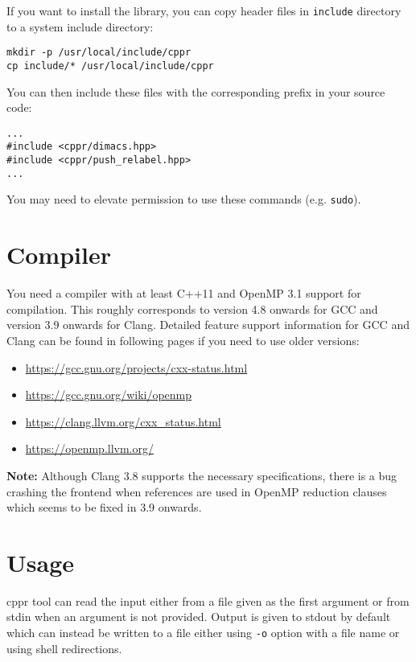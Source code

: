 \documentclass{article}
\begin{document}
If you want to install the library, you can copy header files in \texttt{include}
directory to a system include directory:

\begin{verbatim}
mkdir -p /usr/local/include/cppr
cp include/* /usr/local/include/cppr
\end{verbatim}

You can then include these files with the corresponding prefix in your
source code:

\begin{verbatim}
...
#include <cppr/dimacs.hpp>
#include <cppr/push_relabel.hpp>
...
\end{verbatim}

You may need to elevate permission to use these commands (e.g. \texttt{sudo}).

\section{Compiler}

You need a compiler with at least C++11 and OpenMP 3.1 support for
compilation. This roughly corresponds to version 4.8 onwards for GCC and
version 3.9 onwards for Clang. Detailed feature support information for GCC
and Clang can be found in following pages if you need to use older versions:

\begin{itemize}
    \item \url{https://gcc.gnu.org/projects/cxx-status.html}
    \item \url{https://gcc.gnu.org/wiki/openmp}
    \item \url{https://clang.llvm.org/cxx_status.html}
    \item \url{https://openmp.llvm.org/}
\end{itemize}

\textbf{Note:} Although Clang 3.8 supports the necessary specifications, there is a
bug crashing the frontend when references are used in OpenMP reduction
clauses which seems to be fixed in 3.9 onwards.

\section{Usage}

cppr tool can read the input either from a file given as the first argument
or from stdin when an argument is not provided. Output is given to stdout by
default which can instead be written to a file either using \texttt{-o} option with
a file name or using shell redirections.
\end{document}
